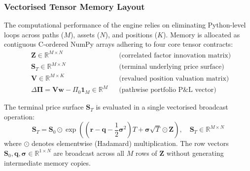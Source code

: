 \documentclass{article}
\theoremstyle{plain}
\theoremstyle{definition}
\theoremstyle{remark}
\begin{document}
\subsubsection{Vectorised Tensor Memory Layout}
The computational performance of the engine relies on eliminating Python-level loops across paths ($M$), assets ($N$), and positions ($K$). Memory is allocated as contiguous C-ordered NumPy arrays adhering to four core tensor contracts:
\begin{align}
    & \mathbf{Z} \in \mathbb{R}^{M \times N} && \text{(correlated factor innovation matrix)} \\
    & \mathbf{S}_T \in \mathbb{R}^{M \times N} && \text{(terminal underlying price surface)} \\
    & \mathbf{V} \in \mathbb{R}^{M \times K} && \text{(revalued position valuation matrix)} \\
    & \Delta \boldsymbol{\Pi} = \mathbf{V}\mathbf{w} - \Pi_0 \mathbf{1}_M \in \mathbb{R}^M && \text{(pathwise portfolio P\&L vector)}
\end{align}

The terminal price surface $\mathbf{S}_T$ is evaluated in a single vectorised broadcast operation:
\begin{equation}
    \mathbf{S}_T = \mathbf{S}_0 \odot \exp\left( \left(\mathbf{r} - \mathbf{q} - \frac{1}{2}\boldsymbol{\sigma}^2\right)T + \boldsymbol{\sigma}\sqrt{T} \odot \mathbf{Z} \right), \quad \mathbf{S}_T \in \mathbb{R}^{M \times N}
\end{equation}
where $\odot$ denotes elementwise (Hadamard) multiplication. The row vectors $\mathbf{S}_0, \mathbf{q}, \boldsymbol{\sigma} \in \mathbb{R}^{1 \times N}$ are broadcast across all $M$ rows of $\mathbf{Z}$ without generating intermediate memory copies.
\end{document}
